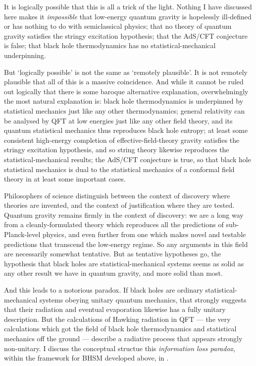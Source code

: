\documentclass[12pt]{article}
\begin{document}
It is logically possible that this is all a trick of the light. Nothing I have discussed here makes it \emph{impossible} that low-energy quantum gravity is hopelessly ill-defined or has nothing to do with semiclassical physics; that no theory of quantum gravity satisfies the stringy excitation hypothesis; that the AdS/CFT conjecture is false; that black hole thermodynamics has no statistical-mechanical underpinning. 

But `logically possible' is not the same as `remotely plausible'. It is not remotely plausible that all of this is a massive coincidence. And while it cannot be ruled out logically that there is some baroque alternative explanation, overwhelmingly the most natural explanation is: black hole thermodynamics is underpinned by statistical mechanics just like any other thermodynamics; general relativity can be analysed by QFT at low energies just like any other field theory, and its quantum statistical mechanics thus reproduces black hole entropy; at least some consistent high-energy completion of effective-field-theory gravity satisfies the stringy excitation hypothesis, and so string theory likewise reproduces the statistical-mechanical results; the AdS/CFT conjecture is true, so that black hole statistical mechanics is dual to the statistical mechanics of a conformal field theory in at least some important cases.

Philosophers of science distinguish between the context of discovery where theories are invented, and the context of justification where they are tested. Quantum gravity remains firmly in the context of discovery: we are a long way from a cleanly-formulated theory which reproduces all the predictions of sub-Planck-level physics, and even further from one which makes novel and testable predictions that transcend the low-energy regime. So any arguments in this field are necessarily somewhat tentative. But as tentative hypotheses go, the hypothesis that black holes are statistical-mechanical systems seems as solid as any other result we have in quantum gravity, and more solid than most. 

And this leads to a notorious paradox. If black holes are ordinary statistical-mechanical systems obeying unitary quantum mechanics, that strongly suggests that their radiation and eventual evaporation likewise has a fully unitary description. But the calculations of Hawking radiation in QFT --- the very calculations which got the field of black hole thermodynamics and statistical mechanics off the ground --- describe a radiative process that appears strongly non-unitary. I discuss the conceptual structue this \emph{information loss paradox}, within the framework for BHSM developed above, in .
\end{document}
